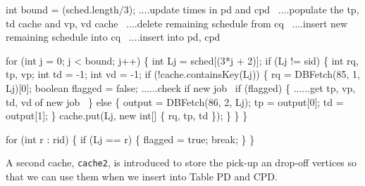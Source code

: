 \documentclass{article}
\def\nwendcode{\endtrivlist \endgroup}
\let\nwdocspar=\par
\theoremstyle{definition}
\begin{document}
\nwendcode{}\endmoddef{}
int bound = (sched.length/3);
\LA{}....update times in pd and cpd~{\nwtagstyle{}}\RA{}
\LA{}....populate the tp, td cache and vp, vd cache~{\nwtagstyle{}}\RA{}
\LA{}....delete remaining schedule from cq~{\nwtagstyle{}}\RA{}
\LA{}....insert new remaining schedule into cq~{\nwtagstyle{}}\RA{}
\LA{}....insert into pd, cpd~{\nwtagstyle{}}\RA{}
\nwendcode{}\nwdocspar
\nwenddocs{}\endmoddef{}
for (int j = 0; j < bound; j++) \{
  int Lj = sched[(3*j + 2)];
  if (Lj != sid) \{
    int rq, tp, vp;
    int td = -1;
    int vd = -1;
    if (!cache.containsKey(Lj)) \{
      rq = DBFetch(85, 1, Lj)[0];
      boolean flagged = false;
      \LA{}......check if new job~{\nwtagstyle{}}\RA{}
      if (flagged) \{
        \LA{}......get tp, vp, td, vd of new job~{\nwtagstyle{}}\RA{}
      \} else \{
        output = DBFetch(86, 2, Lj);
        tp = output[0];
        td = output[1];
      \}
      cache.put(Lj, new int[] \{ rq, tp, td \});
    \}
  \}
\}
\nwendcode{}\nwdocspar
\nwenddocs{}\endmoddef{}
for (int r : rid) \{
  if (Lj == r) \{
    flagged = true;
    break;
  \}
\}
\nwendcode{}\nwdocspar
A second cache, {\tt{}cache2}, is introduced to store the pick-up an drop-off
vertices so that we can use them when we insert into Table PD and CPD.
\end{document}
